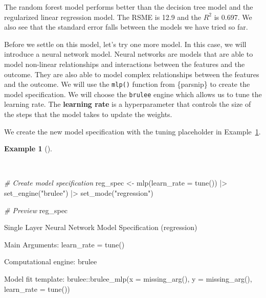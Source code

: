 \documentclass[
  letterpaper,
]{latex/krantz}
\newenvironment{Shaded}{\begin{snugshade}}{\end{snugshade}}
\newcommand{\AttributeTok}[1]{\textcolor[rgb]{0.00,0.00,0.00}{#1}}
\newcommand{\CommentTok}[1]{\textcolor[rgb]{0.00,0.00,0.00}{\textit{#1}}}
\newcommand{\FunctionTok}[1]{\textcolor[rgb]{0.00,0.00,0.00}{#1}}
\newcommand{\NormalTok}[1]{\textcolor[rgb]{0.00,0.00,0.00}{#1}}
\newcommand{\OtherTok}[1]{\textcolor[rgb]{0.00,0.00,0.00}{#1}}
\newcommand{\SpecialCharTok}[1]{\textcolor[rgb]{0.00,0.00,0.00}{#1}}
\newcommand{\StringTok}[1]{\textcolor[rgb]{0.00,0.00,0.00}{#1}}
\theoremstyle{definition}
\newtheorem{example}{Example}[chapter]
\theoremstyle{remark}
\begin{document}
The random forest model performs better than the decision tree model and
the regularized linear regression model. The RSME is 12.9 and the
\(R^2\) is 0.697. We also see that the standard error falls between the
models we have tried so far.

Before we settle on this model, let's try one more model. In this case,
we will introduce a neural network model. Neural networks are models
that are able to model non-linear relationships and interactions between
the features and the outcome. They are also able to model complex
relationships between the features and the outcome. We will use the
\texttt{mlp()} function from \{parsnip\} to create the model
specification. We will choose the \texttt{brulee} engine which allows us
to tune the learning rate. The \textbf{learning rate} is a
hyperparameter that controls the size of the steps that the model takes
to update the weights.

We create the new model specification with the tuning placeholder in
Example~\ref{exm-predict-reg-model-spec-mlp}.

\begin{example}[]\protect\hypertarget{exm-predict-reg-model-spec-mlp}{}\label{exm-predict-reg-model-spec-mlp}

~

\begin{Shaded}
\begin{Highlighting}[]
\CommentTok{\# Create model specification}
\NormalTok{reg\_spec }\OtherTok{\textless{}{-}}
  \FunctionTok{mlp}\NormalTok{(}\AttributeTok{learn\_rate =} \FunctionTok{tune}\NormalTok{()) }\SpecialCharTok{|\textgreater{}}
  \FunctionTok{set\_engine}\NormalTok{(}\StringTok{"brulee"}\NormalTok{) }\SpecialCharTok{|\textgreater{}}
  \FunctionTok{set\_mode}\NormalTok{(}\StringTok{"regression"}\NormalTok{)}

\CommentTok{\# Preview}
\NormalTok{reg\_spec}
\end{Highlighting}
\end{Shaded}

\begin{Shaded}
\begin{Highlighting}[]
\NormalTok{Single Layer Neural Network Model Specification (regression)}

\NormalTok{Main Arguments:}
\NormalTok{  learn\_rate = tune()}

\NormalTok{Computational engine: brulee}

\NormalTok{Model fit template:}
\NormalTok{brulee::brulee\_mlp(x = missing\_arg(), y = missing\_arg(), learn\_rate = tune())}
\end{Highlighting}
\end{Shaded}

\end{example}
\end{document}
